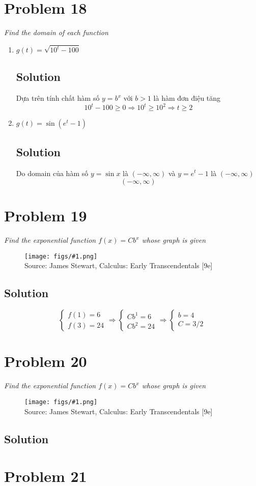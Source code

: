 \documentclass[11pt]{article}
\newcommand{\soln}{\subsection*}
\newcommand{\qn}{\textit}
\newcommand{\imagesource}[1]{{\footnotesize Source: #1}}
\newcommand{\imgqn}[1]{
	\begin{figure}[H]
		\centering
		\texttt{[image: figs/\#1.png]}\\
		\imagesource{James Stewart, Calculus: Early Transcendentals [9e]}
	\end{figure}
}
\begin{document}
\section*{Problem 18}

\qn{Find the domain of each function}

\begin{enumerate}
	\item \qn{$g(t)=\sqrt{10^t-100}$}
	\soln{Solution}
	Dựa trên tính chất hàm số $y=b^x$ với $b>1$ là hàm đơn điệu tăng
	$$10^t-100 \ge 0 \Rightarrow 10^t \ge 10^2 \Rightarrow t \ge 2$$
	
	\item \qn{$g(t)=\sin(e^t-1)$}
	\soln{Solution}
	Do domain của hàm số $y=\sin{x}$ là $(-\infty, \infty)$ và $y=e^t-1$ là $(-\infty, \infty)$
	$$(-\infty, \infty)$$
\end{enumerate}

\section*{Problem 19}

\qn{Find the exponential function $f(x)=Cb^x$ whose graph is given}
\imgqn{1.4.19}

\soln{Solution}
\begin{equation*}
	\begin{cases}
		f(1)=6 \\
		f(3)=24
	\end{cases}
	\Rightarrow
	\begin{cases}
		Cb^1=6 \\
		Cb^2=24
	\end{cases}
	\Rightarrow
	\begin{cases}
		b= 4 \\
		C=3/2
	\end{cases}
\end{equation*}

\section*{Problem 20}

\qn{Find the exponential function $f(x)=Cb^x$ whose graph is given}
\imgqn{1.4.20}

\soln{Solution}

\section*{Problem 21}
\end{document}
